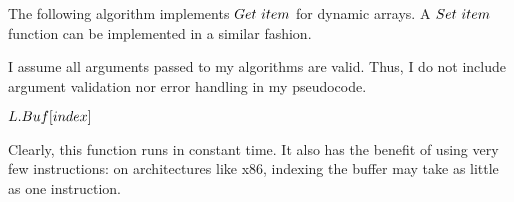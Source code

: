 \HdrDynArrayImpl

The following algorithm implements $Get\ item$ for dynamic arrays. A $Set\ item$ function can be implemented in a similar fashion.

{\HdrNote} I assume all arguments passed to my algorithms are valid. Thus, I do not include argument validation nor error handling in my pseudocode.

\begin{algorithm}
	\begin{algorithmic}[1]
			\State \Return $L.Buf[index]$
		\EndFunction
	\end{algorithmic}
\end{algorithm}

Clearly, this function runs in constant time. It also has the benefit of using very few instructions: on architectures like x86, indexing the buffer may take as little as one instruction.